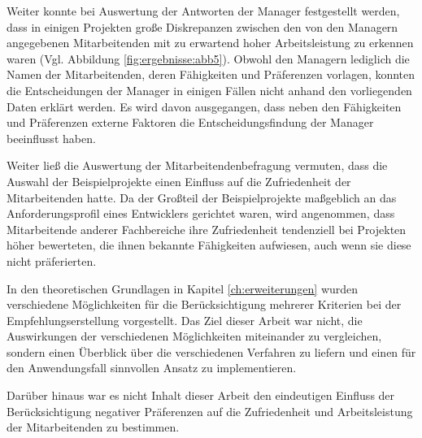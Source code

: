 Weiter konnte bei Auswertung der Antworten der Manager festgestellt werden, dass in einigen Projekten große Diskrepanzen zwischen den von den Managern angegebenen Mitarbeitenden mit zu erwartend hoher Arbeitsleistung zu erkennen waren (Vgl. Abbildung \ref{fig:ergebnisse:abb5}).
Obwohl den Managern lediglich die Namen der Mitarbeitenden, deren Fähigkeiten und Präferenzen vorlagen, konnten die Entscheidungen der Manager in einigen Fällen nicht anhand den vorliegenden Daten erklärt werden.
Es wird davon ausgegangen, dass neben den Fähigkeiten und Präferenzen externe Faktoren die Entscheidungsfindung der Manager beeinflusst haben.

Weiter ließ die Auswertung der Mitarbeitendenbefragung vermuten, dass die Auswahl der Beispielprojekte einen Einfluss auf die Zufriedenheit der Mitarbeitenden hatte.
Da der Großteil der Beispielprojekte maßgeblich an das Anforderungsprofil eines Entwicklers gerichtet waren, wird angenommen, dass Mitarbeitende anderer Fachbereiche ihre Zufriedenheit tendenziell bei Projekten höher bewerteten, die ihnen bekannte Fähigkeiten aufwiesen, auch wenn sie diese nicht präferierten.

In den theoretischen Grundlagen in Kapitel \ref{ch:erweiterungen} wurden verschiedene Möglichkeiten für die Berücksichtigung mehrerer Kriterien bei der Empfehlungserstellung vorgestellt.
Das Ziel dieser Arbeit war nicht, die Auswirkungen der verschiedenen Möglichkeiten miteinander zu vergleichen, sondern einen Überblick über die verschiedenen Verfahren zu liefern und einen für den Anwendungsfall sinnvollen Ansatz zu implementieren.

Darüber hinaus war es nicht Inhalt dieser Arbeit den eindeutigen Einfluss der Berücksichtigung negativer Präferenzen auf die Zufriedenheit und Arbeitsleistung der Mitarbeitenden zu bestimmen.

